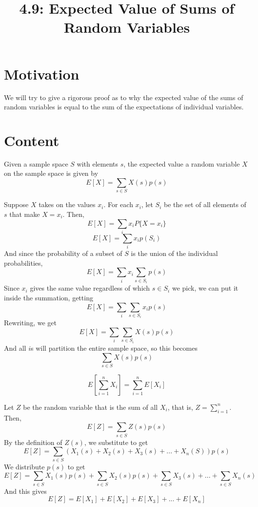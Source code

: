\documentclass{article}
\title{4.9: Expected Value of Sums of Random Variables}
\begin{document}
\maketitle


\section{Motivation}

We will try to give a rigorous proof as to why the expected value of the sums of random variables is equal to the sum of the expectations of individual variables.

\section{Content}

\begin{proposition}

Given a sample space $S$ with elements $s$, the expected value a random variable $X$ on the sample space is given by $$E[X] = \sum_{s \in S} X(s)p(s)$$
\end{proposition}

\begin{customproof}
Suppose $X$ takes on the values $x_i$. For each $x_i$, let $S_i$ be the set of all elements of $s$ that make $X = x_i$. Then, $$E[X] = \sum_i x_iP\{X = x_i\}$$$$E[X] = \sum_i x_ip(S_i)$$And since the probability of a subset of $S$ is the union of the individual probabilities, $$E[X] = \sum_i x_i\sum_{s\in S_i}p(s)$$Since $x_i$ gives the same value regardless of which $s \in S_i$ we pick, we can put it inside the summation, getting$$E[X] = \sum_i\sum_{s\in S_i} x_ip(s)$$Rewriting, we get $$E[X] = \sum_i\sum_{s \in S_i} X(s)p(s)$$And all $i$s will partition the entire sample space, so this becomes $$\sum_{s\in S}X(s)p(s)$$
\end{customproof}

\begin{proposition}
$$E[\sum_{i=1}^{n} X_i] = \sum_{i=1}^n E[X_i]$$
\end{proposition}

\begin{customproof}
Let $Z$ be the random variable that is the sum of all $X_i$, that is, $Z = \sum_{i=1}^n$. Then, $$E[Z] = \sum_{s\in S}Z(s)p(s)$$By the definition of $Z(s)$, we substitute to get $$E[Z] = \sum_{s\in S}(X_1(s) + X_2(s) + X_3(s) + ... + X_n(S))p(s)$$We distribute $p(s)$ to get $$E[Z] = \sum_{s\in S} X_1(s)p(s) + \sum_{s\in S} X_2(s)p(s) + \sum_{s\in S} X_3(s) + ... + \sum_{s\in S} X_n(s)$$And this gives $$E[Z] = E[X_1] + E[X_2] + E[X_3] + ... + E[X_n]$$
\end{customproof}
\end{document}
